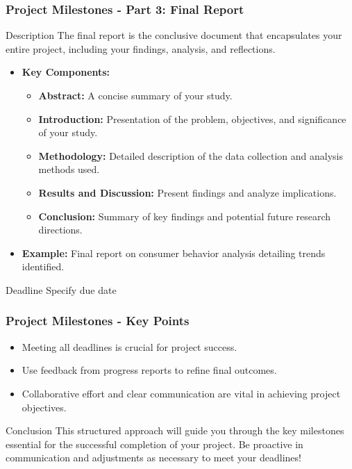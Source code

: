 \documentclass[aspectratio=169]{beamer}
\begin{document}
\begin{frame}[fragile]
    \frametitle{Project Milestones - Part 3: Final Report}
    \begin{block}{Description}
        The final report is the conclusive document that encapsulates your entire project, including your findings, analysis, and reflections.
    \end{block}

    \begin{itemize}
        \item \textbf{Key Components:}
            \begin{itemize}
                \item \textbf{Abstract:} A concise summary of your study.
                \item \textbf{Introduction:} Presentation of the problem, objectives, and significance of your study.
                \item \textbf{Methodology:} Detailed description of the data collection and analysis methods used.
                \item \textbf{Results and Discussion:} Present findings and analyze implications.
                \item \textbf{Conclusion:} Summary of key findings and potential future research directions.
            \end{itemize}
        \item \textbf{Example:} Final report on consumer behavior analysis detailing trends identified.
    \end{itemize}
    
    \begin{block}{Deadline}
        Specify due date
    \end{block}
\end{frame}

\begin{frame}[fragile]
    \frametitle{Project Milestones - Key Points}
    \begin{itemize}
        \item Meeting all deadlines is crucial for project success.
        \item Use feedback from progress reports to refine final outcomes.
        \item Collaborative effort and clear communication are vital in achieving project objectives.
    \end{itemize}
    
    \begin{block}{Conclusion}
        This structured approach will guide you through the key milestones essential for the successful completion of your project. Be proactive in communication and adjustments as necessary to meet your deadlines!
    \end{block}
\end{frame}
\end{document}
